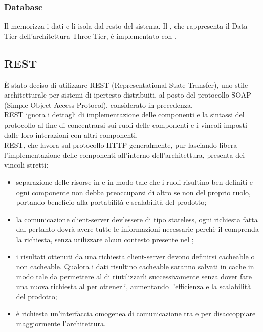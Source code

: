 \documentclass[a4paper, titlepage]{article}
\begin{document}
	\subsubsection{Database}
	Il  memorizza i dati e li isola dal resto del sistema. Il , che rappresenta il Data Tier dell'architettura Three-Tier, è implementato con . 
	
	\subsection{REST}
	È stato deciso di utilizzare REST (Representational State Transfer), uno stile architetturale per sistemi di ipertesto distribuiti, al posto del protocollo SOAP (Simple Object Access Protocol), considerato in precedenza.
	\\ REST ignora i dettagli di implementazione delle componenti e la sintassi del protocollo al fine di concentrarsi sui ruoli delle componenti e i vincoli imposti dalle loro interazioni con altri componenti.
	\\ REST, che lavora sul protocollo HTTP generalmente, pur lasciando libera l'implementazione delle componenti all'interno dell'architettura, presenta dei vincoli stretti:
	\begin{itemize}
	\item separazione delle risorse in  e  in modo tale che i ruoli risultino ben definiti e ogni componente non debba preoccuparsi di altro se non del proprio ruolo, portando beneficio alla portabilità e scalabilità del prodotto;
	\item la comunicazione client-server dev'essere di tipo stateless, ogni richiesta fatta dal  pertanto dovrà avere tutte le informazioni necessarie perchè il  comprenda la richiesta, senza utilizzare alcun contesto presente nel ;
	\item i risultati ottenuti da una richiesta client-server devono definirsi cacheable o non cacheable. Qualora i dati risultino cacheable saranno salvati in cache in modo tale da permettere al  di riutilizzarli successivamente senza dover fare una nuova richiesta al  per ottenerli, aumentando l'efficienza e la scalabilità del prodotto;
	\item è richiesta un'interfaccia omogenea di comunicazione tra  e  per disaccoppiare maggiormente l'architettura.
	\end{itemize}
\newpage
\end{document}
